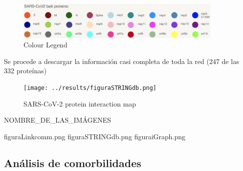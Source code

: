 	\begin{figure}[h!]
		\includegraphics[width=0.9\textwidth]{figures/PPIColourLegend.png}
		\caption{Colour Legend}
		\label{fig:ppi_legend}
	\end{figure}

Se procede a descargar la información casi completa de toda la red (247 de las 332 proteínas)

	\begin{figure}[h!]
		\texttt{[image: ../results/figuraSTRINGdb.png]}
		\caption{SARS-CoV-2 protein interaction map}
		\label{fig:ppi_stringdb}
	\end{figure}
	
	
NOMBRE_DE_LAS_IMÁGENES

figuraLinkcomm.png
figuraSTRINGdb.png
figuraiGraph.png
	
\subsection{Análisis de comorbilidades}